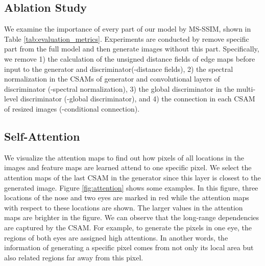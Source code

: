 \subsection{Ablation Study}
We examine the importance of every part of our model by MS-SSIM, shown in Table \ref{tab:evaluation_metrics}. Experiments are conducted by remove specific part from the full model and then generate images without this part. Specifically, we remove 1) the calculation of the unsigned distance fields of edge maps before input to the generator and discriminator(-distance fields), 2) the spectral normalization in the CSAMs of generator and convolutional layers of discriminator (-spectral normalization), 3) the global discriminator in the multi-level discriminator (-global discriminator), and 4) the connection in each CSAM of resized images (-conditional connection). 
%
\subsection{Self-Attention}
We visualize the attention maps to find out how pixels of all locations in the images and feature maps are learned attend to one specific pixel. We select the attention maps of the last CSAM in the generator since this layer is closest to the generated image.  Figure \ref{fig:attention} shows some examples. In this figure, three locations of the nose and two eyes are marked in red while the attention maps with respect to these locations are shown. The larger values in the attention maps are brighter in the figure. We can observe that the long-range dependencies are captured by the CSAM. For example, to generate the pixels in one eye, the regions of both eyes are assigned high attentions. In another words, the information of generating a specific pixel comes from not only its local area but also related regions far away from this pixel. 
%

%